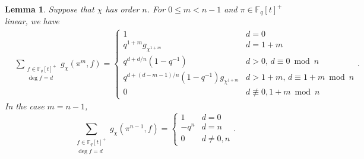 \documentclass[11pt,letterpaper]{article}
\newtheorem{lemma}[theorem]{Lemma}
\theoremstyle{definition}
\theoremstyle{remark}
\numberwithin{equation}{section}
\theoremstyle{dotless}
\newcommand{\F}{\mathbb{F}}
\begin{document}
\begin{lemma}\label{GaussSumSum}
Suppose that $\chi$ has order $n$. For $0 \leq m < n-1$ and $\pi \in \F_q[t]^+$ linear, we have 
\begin{equation}
\begin{split}
&\sum_{\substack{f\in \F_q[t]^+ \\ \deg f = d}} g_{\chi}(\pi^{m}, f) = \left\lbrace\begin{array}{cc} 
1 & d=0 \\
q^{1+m}g_{\chi^{1+m}} & d=1+m \\
q^{d+d/n}(1-q^{-1}) & d>0, \, d\equiv 0 \bmod n \\
q^{d+(d-m-1)/n}(1-q^{-1})g_{\chi^{1+m}} & d>1+m, \, d \equiv 1+m \bmod n \\
0 & d \not\equiv 0, 1+m \bmod n \end{array}\right. .
\end{split}
\end{equation}
In the case $m=n-1$,
\begin{equation}
\sum_{\substack{f\in \F_q[t]^+ \\ \deg f = d}} g_{\chi}(\pi^{n-1}, f) = \left\lbrace\begin{array}{cc} 
1 & d=0 \\
-q^n & d=n \\
0 & d \neq 0, n
\end{array}\right. .
\end{equation}
\end{lemma}
\end{document}
